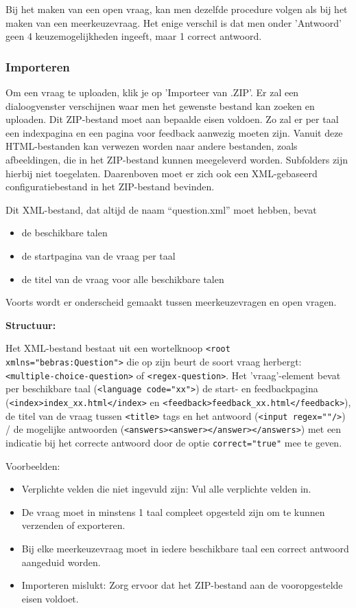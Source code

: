 \documentclass[]{article}
\begin{document}
Bij het maken van een open vraag, kan men dezelfde procedure volgen als bij het maken van een meerkeuzevraag. Het enige verschil is dat men onder 'Antwoord' geen 4 keuzemogelijkheden ingeeft, maar 1 correct antwoord.

\subsubsection{Importeren}
Om een vraag te uploaden, klik je op 'Importeer van .ZIP'. Er zal een dialoogvenster verschijnen waar men het gewenste bestand kan zoeken en uploaden. Dit ZIP-bestand moet aan bepaalde eisen voldoen. Zo zal er per taal een indexpagina en een pagina voor feedback aanwezig moeten zijn. Vanuit deze HTML-bestanden kan verwezen worden naar andere bestanden, zoals afbeeldingen, die in het ZIP-bestand kunnen meegeleverd worden. Subfolders zijn hierbij niet toegelaten. Daarenboven moet er zich ook een XML-gebaseerd configuratiebestand in het ZIP-bestand bevinden. 

Dit XML-bestand, dat altijd de naam "`question.xml"' moet hebben, bevat
\begin{itemize}
\item de beschikbare talen
\item de startpagina van de vraag per taal
\item de titel van de vraag voor alle beschikbare talen
\end{itemize}

Voorts wordt er onderscheid gemaakt tussen meerkeuzevragen en open vragen.

\textbf{Structuur:}

Het XML-bestand bestaat uit een wortelknoop \verb+<root xmlns="bebras:Question">+ 
die op zijn beurt de soort vraag herbergt: \verb+<multiple-choice-question>+ of \verb+<regex-question>+.
Het 'vraag'-element bevat per beschikbare taal (\verb+<language code="xx">+) 
de start- en feedbackpagina (\verb+<index>index_xx.html</index>+ en \verb+<feedback>feedback_xx.html</feedback>+), 
de titel van de vraag tussen \verb+<title>+ tags 
en het antwoord (\verb+<input regex=""/>+) / de mogelijke antwoorden (\verb+<answers><answer></answer></answers>+)
met een indicatie bij het correcte antwoord door de optie \verb+correct="true"+ mee te geven.

Voorbeelden:

 

\begin{itemize}
\item Verplichte velden die niet ingevuld zijn: Vul alle verplichte velden in.
\item De vraag moet in minstens 1 taal compleet opgesteld zijn om te kunnen verzenden of exporteren.
\item Bij elke meerkeuzevraag moet in iedere beschikbare taal een correct antwoord aangeduid worden.
\item Importeren mislukt: Zorg ervoor dat het ZIP-bestand aan de vooropgestelde eisen voldoet.
\end{itemize}
\end{document}
